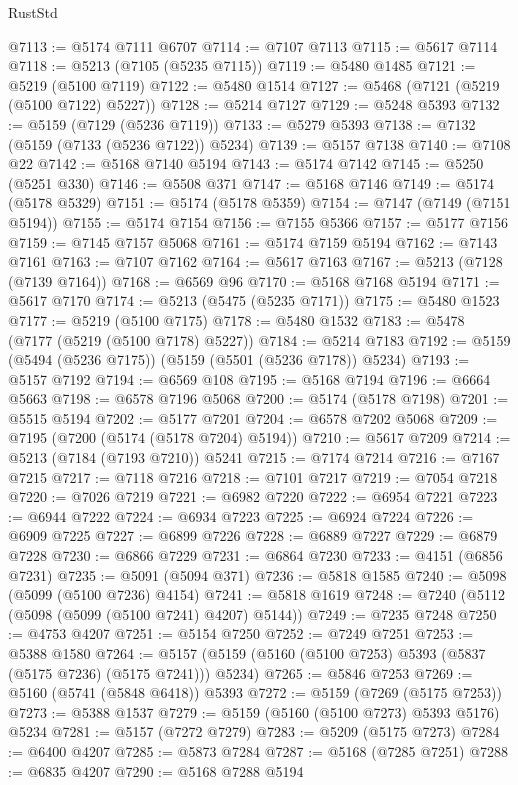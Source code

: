 \begin{lexlean}{RustStd}
\begin{coremodule}
@7113 := @5174 @7111 @6707
@7114 := @7107 @7113
@7115 := @5617 @7114
@7118 := @5213 (@7105 (@5235 @7115))
@7119 := @5480 @1485
@7121 := @5219 (@5100 @7119)
@7122 := @5480 @1514
@7127 := @5468 (@7121 (@5219 (@5100 @7122) @5227))
@7128 := @5214 @7127
@7129 := @5248 @5393
@7132 := @5159 (@7129 (@5236 @7119))
@7133 := @5279 @5393
@7138 := @7132 (@5159 (@7133 (@5236 @7122)) @5234)
@7139 := @5157 @7138
@7140 := @7108 @22
@7142 := @5168 @7140 @5194
@7143 := @5174 @7142
@7145 := @5250 (@5251 @330)
@7146 := @5508 @371
@7147 := @5168 @7146
@7149 := @5174 (@5178 @5329)
@7151 := @5174 (@5178 @5359)
@7154 := @7147 (@7149 (@7151 @5194))
@7155 := @5174 @7154
@7156 := @7155 @5366
@7157 := @5177 @7156
@7159 := @7145 @7157 @5068
@7161 := @5174 @7159 @5194
@7162 := @7143 @7161
@7163 := @7107 @7162
@7164 := @5617 @7163
@7167 := @5213 (@7128 (@7139 @7164))
@7168 := @6569 @96
@7170 := @5168 @7168 @5194
@7171 := @5617 @7170
@7174 := @5213 (@5475 (@5235 @7171))
@7175 := @5480 @1523
@7177 := @5219 (@5100 @7175)
@7178 := @5480 @1532
@7183 := @5478 (@7177 (@5219 (@5100 @7178) @5227))
@7184 := @5214 @7183
@7192 := @5159 (@5494 (@5236 @7175)) (@5159 (@5501 (@5236 @7178)) @5234)
@7193 := @5157 @7192
@7194 := @6569 @108
@7195 := @5168 @7194
@7196 := @6664 @5663
@7198 := @6578 @7196 @5068
@7200 := @5174 (@5178 @7198)
@7201 := @5515 @5194
@7202 := @5177 @7201
@7204 := @6578 @7202 @5068
@7209 := @7195 (@7200 (@5174 (@5178 @7204) @5194))
@7210 := @5617 @7209
@7214 := @5213 (@7184 (@7193 @7210)) @5241
@7215 := @7174 @7214
@7216 := @7167 @7215
@7217 := @7118 @7216
@7218 := @7101 @7217
@7219 := @7054 @7218
@7220 := @7026 @7219
@7221 := @6982 @7220
@7222 := @6954 @7221
@7223 := @6944 @7222
@7224 := @6934 @7223
@7225 := @6924 @7224
@7226 := @6909 @7225
@7227 := @6899 @7226
@7228 := @6889 @7227
@7229 := @6879 @7228
@7230 := @6866 @7229
@7231 := @6864 @7230
@7233 := @4151 (@6856 @7231)
@7235 := @5091 (@5094 @371)
@7236 := @5818 @1585
@7240 := @5098 (@5099 (@5100 @7236) @4154)
@7241 := @5818 @1619
@7248 := @7240 (@5112 (@5098 (@5099 (@5100 @7241) @4207) @5144))
@7249 := @7235 @7248
@7250 := @4753 @4207
@7251 := @5154 @7250
@7252 := @7249 @7251
@7253 := @5388 @1580
@7264 := @5157 (@5159 (@5160 (@5100 @7253) @5393 (@5837 (@5175 @7236) (@5175 @7241))) @5234)
@7265 := @5846 @7253
@7269 := @5160 (@5741 (@5848 @6418)) @5393
@7272 := @5159 (@7269 (@5175 @7253))
@7273 := @5388 @1537
@7279 := @5159 (@5160 (@5100 @7273) @5393 @5176) @5234
@7281 := @5157 (@7272 @7279)
@7283 := @5209 (@5175 @7273)
@7284 := @6400 @4207
@7285 := @5873 @7284
@7287 := @5168 (@7285 @7251)
@7288 := @6835 @4207
@7290 := @5168 @7288 @5194

\end{coremodule}
\end{lexlean}
